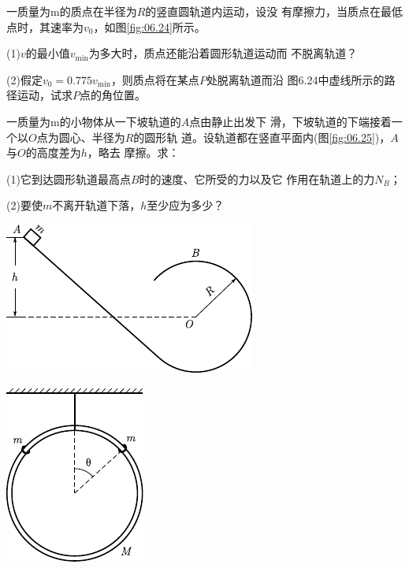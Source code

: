 \begin{exercises}
\exercise 一质量为m的质点在半径为$ R $的竖直圆轨道内运动，设没
有摩擦力，当质点在最低点时，其速率为$ v_ 0 $，如图\ref{fig:06.24}\;所示。

(1)$ v $的最小值$ v _ { \min } $为多大时，质点还能沿着圆形轨道运动而
不脱离轨道？

(2)假定$ v _ { 0 } = 0.775 v _ { \min } $，则质点将在某点$ P $处脱离轨道而沿
图6.24中虚线所示的路径运动，试求$ P $点的角位置。

\exercise 一质量为m的小物体从一下坡轨道的$ A $点由静止出发下
滑，下坡轨道的下端接着一个以$ O $点为圆心、半径为$ R $的圆形轨
道。设轨道都在竖直平面内(图\ref{fig:06.25})，$ A $与$ O $的高度差为$ h $，略去
摩擦。求：

(1)它到达圆形轨道最高点$ B $时的速度、它所受的力以及它
作用在轨道上的力$ N _ { B } $；

(2)要使$ m $不离开轨道下落，$ h $至少应为多少？

\vspace{1.56em}
\begin{figurex}
    \begin{minipage}[b]{0.63\linewidth}
        \centering
        \includegraphics{figure/fig06.25}
        \caption{}
        \label{fig:06.25}
    \end{minipage}
    \begin{minipage}[b]{0.35\linewidth}
        \centering
        \includegraphics{figure/fig06.26}
        \caption{}
        \label{fig:06.26}
    \end{minipage}
\end{figurex}
\vspace{1.56em}


\end{exercises}
